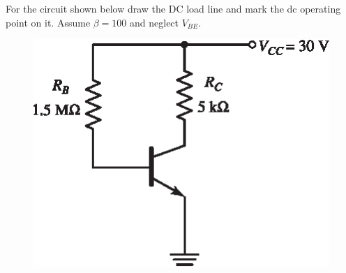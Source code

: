 \begin{example}\label{exam4.7}
For the circuit shown below draw the DC load line and mark the dc operating point on it. Assume $\beta=100$ and neglect $V_{BE}$.
\begin{figure}[H]
\centering
\includegraphics{chap3/S3-EE-03-IN011.eps}
\end{figure}
\end{example}

